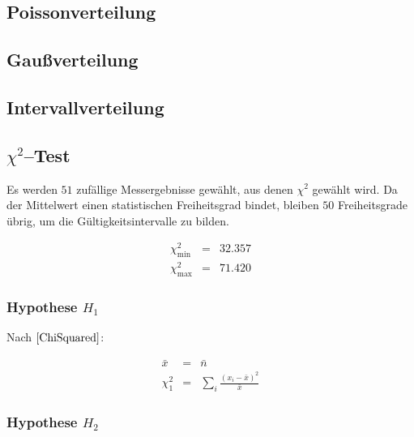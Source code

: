 \documentclass[12pt,a4paper]{scrartcl}
\numberwithin{equation}{section} %
\renewcommand{\[}{} %
\renewcommand{\]}{\noindent} %
\begin{document}
\hypertarget{poissonverteilung}{%
\subsection{Poissonverteilung}\label{poissonverteilung}}

\hypertarget{gauuxdfverteilung}{%
\subsection{Gaußverteilung}\label{gauuxdfverteilung}}

\hypertarget{intervallverteilung}{%
\subsection{Intervallverteilung}\label{intervallverteilung}}

\hypertarget{chi2test}{%
\subsection{\texorpdfstring{\(\chi^2\)--Test}{\textbackslash chi\^{}2--Test}}\label{chi2test}}

Es werden \(51\) zufällige Messergebnisse gewählt, aus denen \(\chi^2\)
gewählt wird. Da der Mittelwert einen statistischen Freiheitsgrad
bindet, bleiben \(50\) Freiheitsgrade übrig, um die
Gültigkeitsintervalle zu bilden.

\[
\begin{eqnarray}
    \chi^2_\mathrm{min} &=& 32.357 \\
    \chi^2_\mathrm{max} &=& 71.420
\end{eqnarray}
\]

\hypertarget{hypothese-h_1}{%
\subsubsection{\texorpdfstring{Hypothese
\(H_1\)}{Hypothese H\_1}}\label{hypothese-h_1}}

Nach \(\eqref{ChiSquared}\):

\[
\begin{eqnarray}
    \bar x &=& \bar n \\
    \chi^2_1 &=& \sum_i \frac{(x_i-\bar x)^2}{\bar x}
\end{eqnarray}
\]

\hypertarget{hypothese-h_2}{%
\subsubsection{\texorpdfstring{Hypothese
\(H_2\)}{Hypothese H\_2}}\label{hypothese-h_2}}
\end{document}

